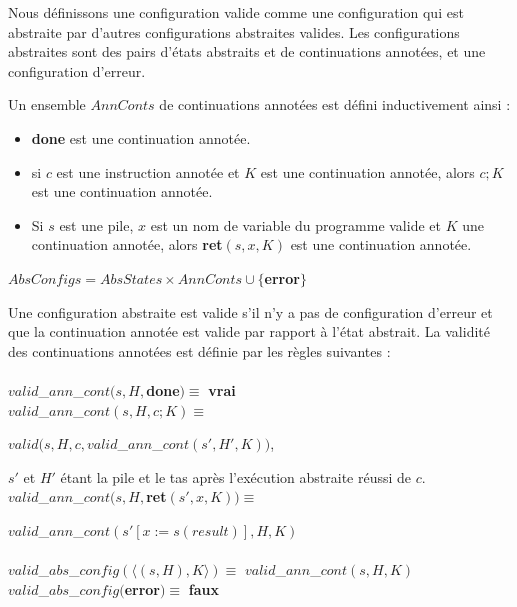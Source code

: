 \documentclass[11pt,openany]{article}
\begin{document}
		Nous d\'efinissons une configuration valide comme une configuration qui est abstraite par d'autres configurations abstraites valides. Les configurations abstraites sont des pairs d'\'etats abstraits et de continuations annot\'ees, et une configuration d'erreur. 
		
		Un ensemble $AnnConts$ de continuations annot\'ees est d\'efini inductivement ainsi :
		
		\begin{itemize}
		\item \textbf{done} est une continuation annot\'ee.
		\item si $c$ est une instruction annot\'ee et $K$ est une continuation annot\'ee, alors $c;K$ est une continuation annot\'ee.
		\item Si $s$ est une pile, $x$ est un nom de variable du programme valide et $K$ une continuation annot\'ee, alors \textbf{ret}$(s,x,K)$ est une continuation annot\'ee.
		\end{itemize}
		
		\begin{center}
		$AbsConfigs = AbsStates \times AnnConts \cup \{$\textbf{error}$\}$
		\end{center}
		
		Une configuration abstraite est valide s'il n'y a pas de configuration d'erreur et que la continuation annot\'ee est valide par rapport \`a l'\'etat abstrait. La validit\'e des continuations annot\'ees est d\'efinie par les r\`egles suivantes :\\ \\  
		$valid$_$ann$_$cont(s,H,$\textbf{done}$) \equiv$ \textbf{vrai}\\
		$valid$_$ann$_$cont(s,H,c;K)\equiv$ 
		
		$valid(s,H,c,valid$_$ann$_$cont(s',H',K))$,
		
		 $s'$ et $H'$ \'etant la pile et le tas apr\`es l'ex\'ecution abstraite r\'eussi de $c$.\\
		$valid$_$ann$_$cont(s,H,$\textbf{ret}$(s',x,K))\equiv$
		
		$valid$_$ann$_$cont(s'[x:=s(result)],H,K)$\\ \\
		$valid$_$abs$_$config(\langle (s,H),K\rangle)\equiv$ $valid$_$ann$_$cont(s,H,K)$\\
		$valid$_$abs$_$config($\textbf{error}$)\equiv$ \textbf{faux}
		
\end{document}
